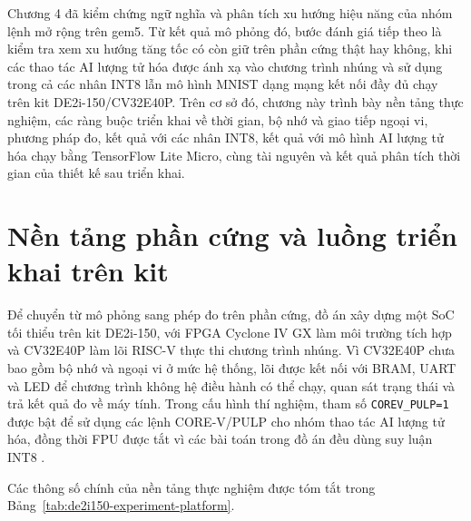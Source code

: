 \documentclass[../DoAn.tex]{subfiles}
\begin{document}
Chương 4 đã kiểm chứng ngữ nghĩa và phân tích xu hướng hiệu năng của nhóm lệnh mở rộng trên gem5. Từ kết quả mô phỏng đó, bước đánh giá tiếp theo là kiểm tra xem xu hướng tăng tốc có còn giữ trên phần cứng thật hay không, khi các thao tác AI lượng tử hóa được ánh xạ vào chương trình nhúng và sử dụng trong cả các nhân INT8 lẫn mô hình MNIST dạng mạng kết nối đầy đủ chạy trên kit DE2i-150/CV32E40P. Trên cơ sở đó, chương này trình bày nền tảng thực nghiệm, các ràng buộc triển khai về thời gian, bộ nhớ và giao tiếp ngoại vi, phương pháp đo, kết quả với các nhân INT8, kết quả với mô hình AI lượng tử hóa chạy bằng TensorFlow Lite Micro, cùng tài nguyên và kết quả phân tích thời gian của thiết kế sau triển khai.

\section{Nền tảng phần cứng và luồng triển khai trên kit}
\label{sec:nen-tang-phan-cung-kit}

Để chuyển từ mô phỏng sang phép đo trên phần cứng, đồ án xây dựng một SoC tối thiểu trên kit DE2i-150, với FPGA Cyclone IV GX làm môi trường tích hợp và CV32E40P làm lõi RISC-V thực thi chương trình nhúng. Vì CV32E40P chưa bao gồm bộ nhớ và ngoại vi ở mức hệ thống, lõi được kết nối với BRAM, UART và LED để chương trình không hệ điều hành có thể chạy, quan sát trạng thái và trả kết quả đo về máy tính. Trong cấu hình thí nghiệm, tham số \texttt{COREV\_PULP=1} được bật để sử dụng các lệnh CORE-V/PULP cho nhóm thao tác AI lượng tử hóa, đồng thời FPU được tắt vì các bài toán trong đồ án đều dùng suy luận INT8 \cite{openhw_cv32e40p_um_2024}.

Các thông số chính của nền tảng thực nghiệm được tóm tắt trong Bảng~\ref{tab:de2i150-experiment-platform}.
\end{document}
